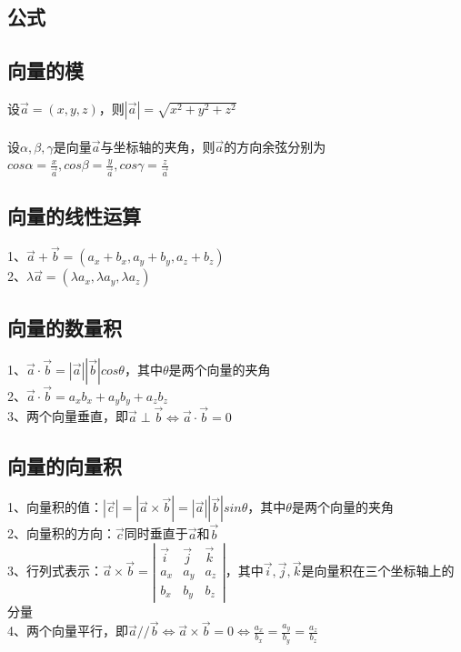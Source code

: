 \documentclass{article}
\begin{document}
\begin{flushleft}
	\LARGE
	
	\section{公式}

	\subsection{向量的模}
	
	设$\vec{a}=(x,y,z)$，则$|\vec{a}|=\sqrt{x^2+y^2+z^2}$\\
	~\\
	设$\alpha,\beta,\gamma$是向量$\vec{a}$与坐标轴的夹角，则$\vec{a}$的方向余弦分别为$cos\alpha=\frac{x}{\vec{a}},cos\beta=\frac{y}{\vec{a}},cos\gamma=\frac{z}{\vec{a}}$\\
	
	\subsection{向量的线性运算}
	
	1、$\vec{a}+\vec{b}=(a_x+b_x,a_y+b_y,a_z+b_z)$\\
	2、$\lambda\vec{a}=(\lambda a_x,\lambda a_y,\lambda a_z)$\\
	
	\subsection{向量的数量积}
	
	1、$\vec{a}\cdot\vec{b}=|\vec{a}||\vec{b}|cos\theta$，其中$\theta$是两个向量的夹角\\
	2、$\vec{a}\cdot\vec{b}=a_xb_x+a_yb_y+a_zb_z$\\
	3、两个向量垂直，即$\vec{a}\perp\vec{b}\Leftrightarrow\vec{a}\cdot\vec{b}=0$\\
	
	\subsection{向量的向量积}
	
	1、向量积的值：$|\vec{c}|=|\vec{a}\times\vec{b}|=|\vec{a}||\vec{b}|sin\theta$，其中$\theta$是两个向量的夹角\\
	2、向量积的方向：$\vec{c}$同时垂直于$\vec{a}$和$\vec{b}$\\
	3、行列式表示：$\vec{a}\times\vec{b}=
	\left|\begin{array}{cccc}
	\vec{i}&\vec{j}&\vec{k}\\
	a_x&a_y&a_z\\
	b_x&b_y&b_z
	\end{array}\right|$，其中$\vec{i},\vec{j},\vec{k}$是向量积在三个坐标轴上的分量\\
	4、两个向量平行，即$\vec{a}//\vec{b}\Leftrightarrow\vec{a}\times\vec{b}=0\Leftrightarrow\frac{a_x}{b_x}=\frac{a_y}{b_y}=\frac{a_z}{b_z}$\\
	

\end{flushleft}
\end{document}
